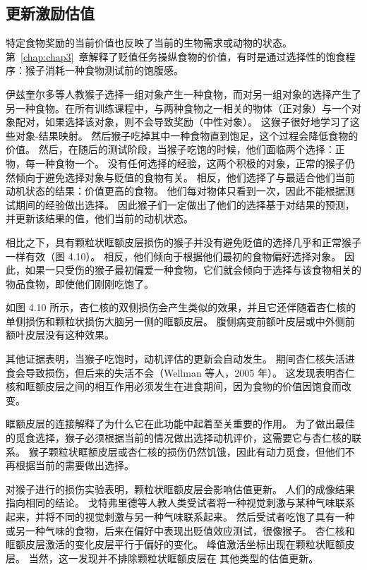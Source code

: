\subsection{更新激励估值}

特定食物奖励的当前价值也反映了当前的生物需求或动物的状态。
第~\ref{chap:chap3}~章解释了贬值任务操纵食物的价值，有时是通过选择性的饱食程序：猴子消耗一种食物测试前的饱腹感。\par


伊兹奎尔多等人\cite{izquierdo2004bilateral}教猴子选择一组对象产生一种食物，而对另一组对象的选择产生了另一种食物。在所有训练课程中，与两种食物之一相关的物体（正对象）与一个对象配对，如果选择该对象，则不会导致奖励（中性对象）。
这猴子很好地学习了这些对象-结果映射。
然后猴子吃掉其中一种食物直到饱足，这个过程会降低食物的价值。
然后，在随后的测试阶段，当猴子吃饱的时候，他们面临两个选择：正物，每一种食物一个。
没有任何选择的经验，这两个积极的对象，正常的猴子仍然倾向于避免选择对象与贬值的食物有关。
相反，他们选择了与最适合他们当前动机状态的结果：价值更高的食物。
他们每对物体只看到一次，因此不能根据测试期间的经验做出选择。
因此猴子们一定做出了他们的选择基于对结果的预测，并更新该结果的值，他们当前的动机状态。\par


相比之下，具有颗粒状眶额皮层损伤的猴子并没有避免贬值的选择几乎和正常猴子一样有效（图 4.10）。
相反，他们倾向于根据他们最初的食物偏好选择对象。
因此，如果一只受伤的猴子最初偏爱一种食物，它们就会倾向于选择与该食物相关的物品食物，即使他们刚刚吃饱了。\par


如图 4.10 所示，杏仁核的双侧损伤会产生类似的效果，并且它还伴随着杏仁核的单侧损伤和颗粒状损伤大脑另一侧的眶额皮层\cite{baxter2000control}。
腹侧病变前额叶皮层或中外侧前额叶皮层没有这种效果\cite{baxter2009ventrolateral}。\par


其他证据表明，当猴子吃饱时，动机评估的更新会自动发生。
期间杏仁核失活进食会导致损伤，但后来的失活不会（Wellman 等人，2005 年）。
这发现表明杏仁核和眶额皮层之间的相互作用必须发生在进食期间，因为食物的价值因饱食而改变。\par


眶额皮层的连接解释了为什么它在此功能中起着至关重要的作用。
为了做出最佳的觅食选择，猴子必须根据当前的情况做出选择动机评价，这需要它与杏仁核的联系。
猴子颗粒状眶额皮层或杏仁核的损伤仍然饥饿，因此有动力觅食，但他们不再根据当前的需要做出选择。\par


对猴子进行的损伤实验表明，颗粒状眶额皮层会影响估值更新。
人们的成像结果指向相同的结论。
戈特弗里德等人\cite{gottfried2003encoding}教人类受试者将一种视觉刺激与某种气味联系起来，并将不同的视觉刺激与另一种气味联系起来。
然后受试者吃饱了具有一种或另一种气味的食物，后来在偏好中表现出贬值效应测试，很像猴子。
杏仁核和眶额皮层激活的变化皮层平行于偏好的变化。
峰值激活坐标出现在颗粒状眶额皮层。
当然，这一发现并不排除颗粒状眶额皮层在
其他类型的估值更新。\par


